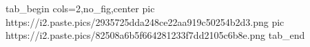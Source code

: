  
 
 
 
 

\ifcmt
  tab_begin cols=2,no_fig,center
     pic https://i2.paste.pics/2935725dda248ce22aa919c50254b2d3.png
		 pic https://i2.paste.pics/82508a6b5f664281233f7dd2105c6b8e.png
  tab_end
\fi

